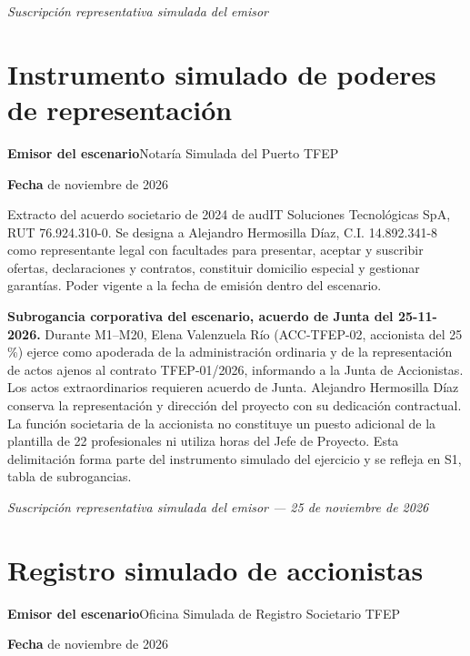 \medskip
\noindent\textit{Suscripción representativa simulada del emisor}\par
\label{adm:escritura-fin}

\clearpage
\section*{Instrumento simulado de poderes de representación}\label{adm:poderes}

\rotuloSimuladoSobreUno
\noindent\textbf{Emisor del escenario}\enspace Notaría Simulada del Puerto TFEP\par
\noindent\textbf{Fecha} de noviembre de 2026\par
\medskip

Extracto del acuerdo societario de 2024 de audIT Soluciones Tecnológicas SpA, RUT 76.924.310-0. Se designa a Alejandro Hermosilla Díaz, C.I. 14.892.341-8 como representante legal con facultades para presentar, aceptar y suscribir ofertas, declaraciones y contratos, constituir domicilio especial y gestionar garantías. Poder vigente a la fecha de emisión dentro del escenario.

\medskip

\par\medskip
\textbf{Subrogancia corporativa del escenario, acuerdo de Junta del 25-11-2026.} Durante M1--M20, Elena Valenzuela Río (ACC-TFEP-02, accionista del 25\,\%) ejerce como apoderada de la administración ordinaria y de la representación de actos ajenos al contrato TFEP-01/2026, informando a la Junta de Accionistas. Los actos extraordinarios requieren acuerdo de Junta. Alejandro Hermosilla Díaz conserva la representación y dirección del proyecto con su dedicación contractual. La función societaria de la accionista no constituye un puesto adicional de la plantilla de 22 profesionales ni utiliza horas del Jefe de Proyecto. Esta delimitación forma parte del instrumento simulado del ejercicio y se refleja en S1, tabla de subrogancias.

\noindent\textit{Suscripción representativa simulada del emisor — 25 de noviembre de 2026}\par
\label{adm:poderes-fin}

\clearpage
\section*{Registro simulado de accionistas}\label{adm:socios}

\rotuloSimuladoSobreUno
\noindent\textbf{Emisor del escenario}\enspace Oficina Simulada de Registro Societario TFEP\par
\noindent\textbf{Fecha} de noviembre de 2026\par
\medskip

